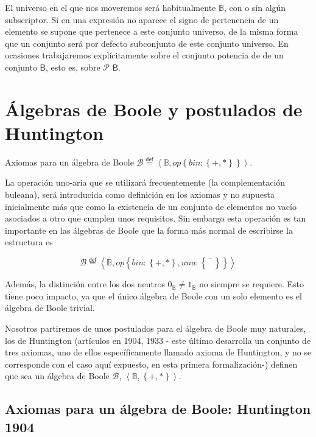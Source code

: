 \documentclass[final,12pt,a4paper,twoside,fleqn]{extbook}
\newcommand{\mathdef}{\ensuremath{\stackrel{\mathsf{def}}{{}={}}}}
\newcommand{\set}[1]{\ensuremath{\left\lbrace{#1}\right\rbrace}}
\newcommand{\setB}{\ensuremath{\mathbb{B}}}
\newcommand{\algB}{\ensuremath{\mathscr{B}}}
\theoremstyle{definition}
\theoremstyle{remark}
\begin{document}
	El universo en el que nos moveremos será habitualmente \(\setB\), con o
sin algún subscriptor. Si en una expresión no aparece el signo de pertenencia
de un elemento se supone que pertenece a este conjunto universo, de la misma
forma que un conjunto será por defecto subconjunto de este conjunto universo.
En ocasiones trabajaremos explícitamente sobre el conjunto potencia de
de un conjunto \(\textsf{B}\), esto es, sobre \large\( \mathscr{P} \)
\normalsize \( \textsf{B} \).


\chapter{Álgebras de Boole y postulados de Huntington}


Axiomas para un álgebra de Boole
\(\algB \mathdef \left\langle
\setB,
op \set{ bin : \set{ + , * } }
\right\rangle\).

La operación uno-aria que se utilizará frecuentemente (la complementación
buleana), será introducida como definición en los axiomas y no supuesta
inicialmente más que como la existencia de un conjunto de elementos no vacío
asociados a otro que cumplen unos requisitos. Sin embargo esta operación es
tan importante en las álgebras de Boole que la forma más normal de escribirse
la estructura es



\begin{equation}
\algB \mathdef \left\langle{\setB,
op\set{bin:\set{+,*},una:\set{\overline{\phantom{A}}}}}
\right\rangle
\end{equation}



	Además, la distinción entre los dos neutros \(0_{\setB} \neq 1_{\setB}\)
no siempre se requiere. Esto tiene poco impacto, ya que el único álgebra de
Boole con un solo elemento es el álgebra de Boole trivial.



	Nosotros partiremos de unos postulados para el álgebra de Boole muy
naturales, los de Huntington (artículos en 1904, 1933 - este último
desarrolla un conjunto de tres axiomas, uno de ellos específicamente llamado
axioma de Huntington, y no se corresponde con el caso aquí expuesto, en esta
primera formalización-) definen que sea un álgebra de Boole \(\algB\),
\(\left\langle{\setB,\set{+,*}}\right\rangle\).



\section{Axiomas para un álgebra de Boole: Huntington 1904}
\end{document}
